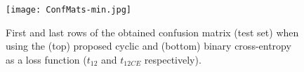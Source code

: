 \documentclass{article}
\begin{document}
\begin{comment}
\multicolumn{1}{|c|}{\textbf{b12}} & \multicolumn{1}{c|}{8}                             & \multicolumn{1}{c|}{2}                             & \multicolumn{1}{c|}{89}                           & \multicolumn{1}{c|}{44}                           & \multicolumn{1}{c|}{6}                            & \multicolumn{1}{c|}{3}                            & \multicolumn{1}{c|}{1}                            & \multicolumn{1}{c|}{7}                            & \multicolumn{1}{c|}{11}                           & \multicolumn{1}{c|}{33}                            & \multicolumn{1}{c|}{131}                           & \multicolumn{1}{c|}{\textbf{165}} \\ \hline
\end{tabular}}
\caption{First and last rows of the obtained confusion matrix (test set) when using the (top) proposed cyclic and (bottom) binary cross-entropy as a loss function ($t_{12}$ and $t_{12CE}$ respectively).}
\label{tab:cmTests}
\end{table}
\end{comment}

\begin{figure}
\begin{center}
  \texttt{[image: ConfMats-min.jpg]}
    \caption{First and last rows of the obtained confusion matrix (test set) when using the (top) proposed cyclic and (bottom) binary cross-entropy as a loss function ($t_{12}$ and $t_{12CE}$ respectively).}
  \label{fig:cmTests}
 \end{center}
\end{figure}
\end{document}
